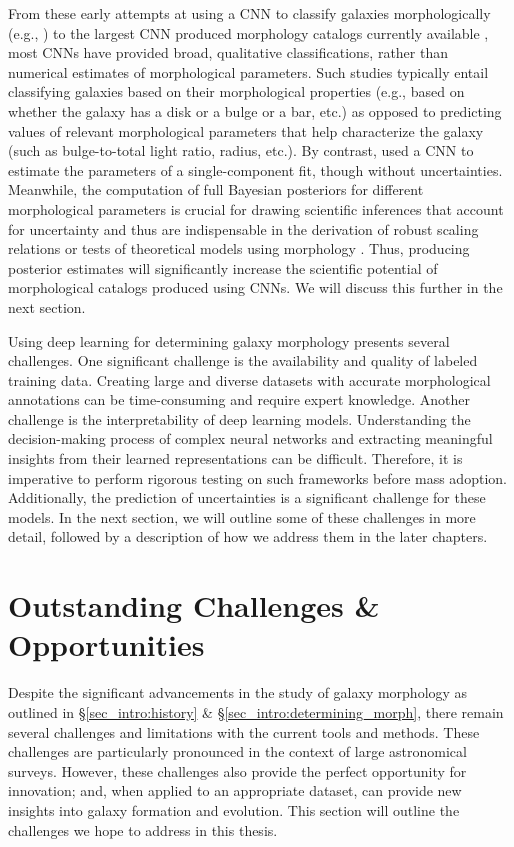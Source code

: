 From these early attempts at using a CNN to classify galaxies morphologically (e.g.,  \citealp{Dieleman2015Rotation-invariantPrediction}) to the largest CNN produced morphology catalogs currently available \citep{Cheng2021GalaxyNetworks, Vega-Ferrero2021PushingSurvey}, most CNNs have provided broad, qualitative classifications, rather than numerical estimates of morphological parameters. Such studies typically entail classifying galaxies based on their morphological properties (e.g., based on whether the galaxy has a disk or a bulge or a bar, etc.) as opposed to predicting values of relevant morphological parameters that help characterize the galaxy (such as bulge-to-total light ratio, radius, etc.). By contrast, \citet{Tuccillo2018DeepFitting} used a CNN to estimate the parameters of a single-component \sersic{} fit, though  without uncertainties. Meanwhile, the computation of full Bayesian posteriors for different morphological parameters is crucial for drawing scientific inferences that account for uncertainty and thus are indispensable in the derivation of robust scaling relations  \citep[e.g.,][]{Bernardi2013TheProfile, vanderWel20143D-HST+CANDELS:3} or tests of theoretical models using morphology \citep[e.g.,][]{Schawinski2014TheGalaxies}. Thus, producing posterior estimates will significantly increase the scientific potential of morphological catalogs produced using CNNs. We will discuss this further in the next section. 

Using deep learning for determining galaxy morphology presents several challenges. One significant challenge is the availability and quality of labeled training data. Creating large and diverse datasets with accurate morphological annotations can be time-consuming and require expert knowledge. Another challenge is the interpretability of deep learning models. Understanding the decision-making process of complex neural networks and extracting meaningful insights from their learned representations can be difficult. Therefore, it is imperative to perform rigorous testing on such frameworks before mass adoption. Additionally, the prediction of uncertainties is a significant challenge for these models. In the next section, we will outline some of these challenges in more detail, followed by a description of how we address them in the later chapters.

\section{Outstanding Challenges \& Opportunities} \label{sec_intro:outstanding_challenges}
Despite the significant advancements in the study of galaxy morphology as outlined in \S \ref{sec_intro:history} \& \S \ref{sec_intro:determining_morph}, there remain several challenges and limitations with the current tools and methods.
These challenges are particularly pronounced in the context of large astronomical surveys. However, these challenges also provide the perfect opportunity for innovation; and, when applied to an appropriate dataset, can provide new insights into galaxy formation and evolution. This section will outline the challenges we hope to address in this thesis. 

